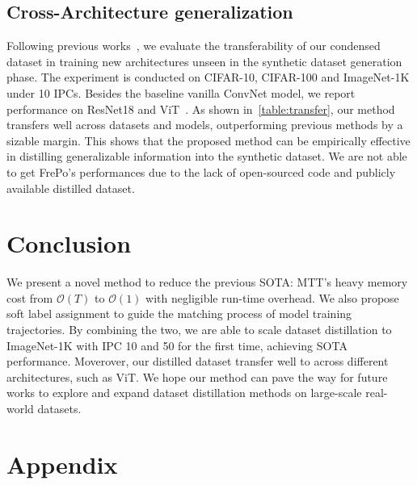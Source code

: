 \documentclass[10pt,twocolumn,letterpaper]{article}
\begin{document}
\subsection{Cross-Architecture generalization}
Following previous works~\cite{zhaodm,cazenavette2022dataset,zhou2022dataset, dcbench}, we evaluate the transferability of our condensed dataset in training new architectures unseen in the synthetic dataset generation phase. The experiment is conducted on CIFAR-10, CIFAR-100 and ImageNet-1K under 10 IPCs.
Besides the baseline vanilla ConvNet model, we report performance on ResNet18 and ViT~\cite{dosovitskiy2020image, dcbench}.
As shown in~\cref{table:transfer}, our method transfers well across datasets and models, outperforming previous methods by a sizable margin.
This shows that the proposed method can be empirically effective in distilling generalizable information into the synthetic dataset. We are not able to get FrePo's performances due to the lack of open-sourced code and publicly available distilled dataset.

\section{Conclusion}
We present a novel method to reduce the previous SOTA: MTT's heavy memory cost from $\mathcal{O}(T)$ to $\mathcal{O}(1)$ with negligible run-time overhead. We also propose soft label assignment to guide the matching process of model training trajectories. By combining the two, we are able to scale dataset distillation to ImageNet-1K with IPC 10 and 50 for the first time, achieving SOTA performance.
Moverover, our distilled dataset transfer well to across different architectures, such as ViT.
We hope our method can pave the way for future works to explore and expand dataset distillation methods on large-scale real-world datasets.


{\small


}


\clearpage

\appendix
\section{Appendix}
\end{document}

